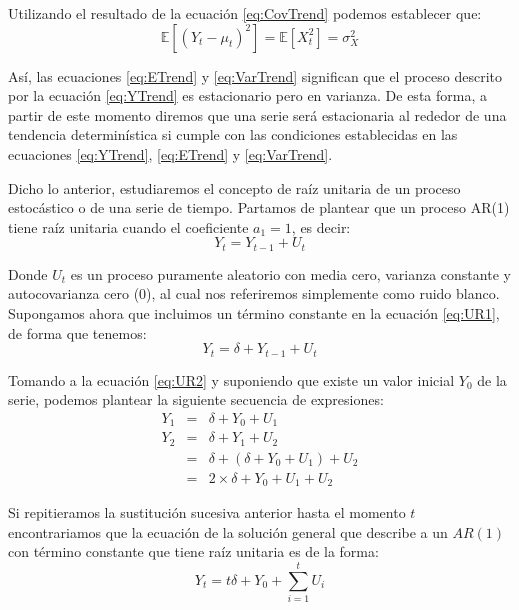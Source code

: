 \documentclass[
]{book}
\begin{document}
Utilizando el resultado de la ecuación \eqref{eq:CovTrend} podemos establecer que:
\begin{equation}
    \mathbb{E}[(Y_t - \mu_t)^2] = \mathbb{E}[X_t^2] = \sigma_X^2
    \label{eq:VarTrend}
\end{equation}

Así, las ecuaciones \eqref{eq:ETrend} y \eqref{eq:VarTrend} significan que el proceso descrito por la ecuación \eqref{eq:YTrend} es estacionario pero en varianza. De esta forma, a partir de este momento diremos que una serie será estacionaria al rededor de una tendencia determinística si cumple con las condiciones establecidas en las ecuaciones \eqref{eq:YTrend}, \eqref{eq:ETrend} y \eqref{eq:VarTrend}.

Dicho lo anterior, estudiaremos el concepto de raíz unitaria de un proceso estocástico o de una serie de tiempo. Partamos de plantear que un proceso AR(1) tiene raíz unitaria cuando el coeficiente \(a_1 = 1\), es decir:
\begin{equation}
    Y_t = Y_{t-1} + U_t
    \label{eq:UR1}
\end{equation}

Donde \(U_t\) es un proceso puramente aleatorio con media cero, varianza constante y autocovarianza cero (0), al cual nos referiremos simplemente como ruido blanco. Supongamos ahora que incluimos un término constante en la ecuación \eqref{eq:UR1}, de forma que tenemos:
\begin{equation}
    Y_t = \delta + Y_{t-1} + U_t
    \label{eq:UR2}
\end{equation}

Tomando a la ecuación \eqref{eq:UR2} y suponiendo que existe un valor inicial \(Y_0\) de la serie, podemos plantear la siguiente secuencia de expresiones:
\begin{eqnarray*}
    Y_1 & = & \delta + Y_0 + U_1 \\
    Y_2 & = & \delta + Y_1 + U_2 \\
    & = & \delta + (\delta + Y_0 + U_1) + U_2 \\
    & = & 2 \times \delta + Y_0 + U_1 + U_2
\end{eqnarray*}

Si repitieramos la sustitución sucesiva anterior hasta el momento \(t\) encontrariamos que la ecuación de la solución general que describe a un \(AR(1)\) con término constante que tiene raíz unitaria es de la forma:
\begin{equation}
    Y_t = t \delta + Y_0 + \sum_{i=1}^t U_i
    \label{eq:UR3}
\end{equation}
\end{document}
